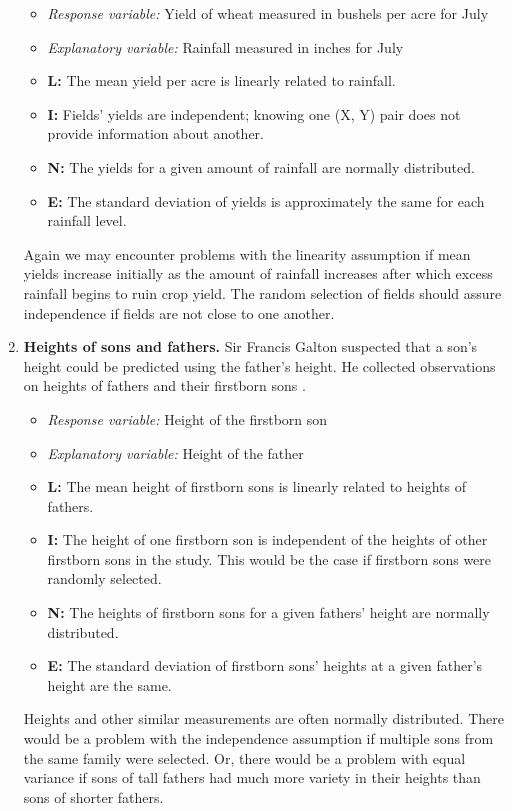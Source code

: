 \documentclass[
]{krantz}
\begin{document}
\begin{enumerate}
  \begin{itemize}
  \item
    \emph{Response variable:} Yield of wheat measured in bushels per acre for July
  \item
    \emph{Explanatory variable:} Rainfall measured in inches for July
  \item
    \textbf{L:} The mean yield per acre is linearly related to rainfall.
  \item
    \textbf{I:} Fields' yields are independent; knowing one (X, Y) pair does not provide information about another.
  \item
    \textbf{N:} The yields for a given amount of rainfall are normally distributed.
  \item
    \textbf{E:} The standard deviation of yields is approximately the same for each rainfall level.\\
  \end{itemize}

  Again we may encounter problems with the linearity assumption if mean yields increase initially as the amount of rainfall increases after which excess rainfall begins to ruin crop yield. The random selection of fields should assure independence if fields are not close to one another.
\item
  \textbf{Heights of sons and fathers.} Sir Francis Galton suspected that a son's height could be predicted using the father's height. He collected observations on heights of fathers and their firstborn sons \citep{Stigler2002}.

  \begin{itemize}
  \item
    \emph{Response variable:} Height of the firstborn son
  \item
    \emph{Explanatory variable:} Height of the father
  \item
    \textbf{L:} The mean height of firstborn sons is linearly related to heights of fathers.
  \item
    \textbf{I:} The height of one firstborn son is independent of the heights of other firstborn sons in the study. This would be the case if firstborn sons were randomly selected.
  \item
    \textbf{N:} The heights of firstborn sons for a given fathers' height are normally distributed.
  \item
    \textbf{E:} The standard deviation of firstborn sons' heights at a given father's height are the same.\\
  \end{itemize}

  Heights and other similar measurements are often normally distributed. There would be a problem with the independence assumption if multiple sons from the same family were selected. Or, there would be a problem with equal variance if sons of tall fathers had much more variety in their heights than sons of shorter fathers.
\end{enumerate}
\end{document}
